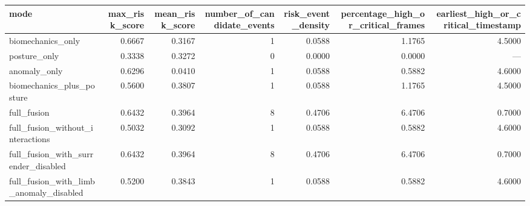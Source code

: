 \begin{tabular}{lrrrrrr}
\toprule
mode & max\_risk\_score & mean\_risk\_score & number\_of\_candidate\_events & risk\_event\_density & percentage\_high\_or\_critical\_frames & earliest\_high\_or\_critical\_timestamp \\
\midrule
biomechanics\_only & 0.6667 & 0.3167 & 1 & 0.0588 & 1.1765 & 4.5000 \\
posture\_only & 0.3338 & 0.3272 & 0 & 0.0000 & 0.0000 & --- \\
anomaly\_only & 0.6296 & 0.0410 & 1 & 0.0588 & 0.5882 & 4.6000 \\
biomechanics\_plus\_posture & 0.5600 & 0.3807 & 1 & 0.0588 & 1.1765 & 4.5000 \\
full\_fusion & 0.6432 & 0.3964 & 8 & 0.4706 & 6.4706 & 0.7000 \\
full\_fusion\_without\_interactions & 0.5032 & 0.3092 & 1 & 0.0588 & 0.5882 & 4.6000 \\
full\_fusion\_with\_surrender\_disabled & 0.6432 & 0.3964 & 8 & 0.4706 & 6.4706 & 0.7000 \\
full\_fusion\_with\_limb\_anomaly\_disabled & 0.5200 & 0.3843 & 1 & 0.0588 & 0.5882 & 4.6000 \\
\bottomrule
\end{tabular}
